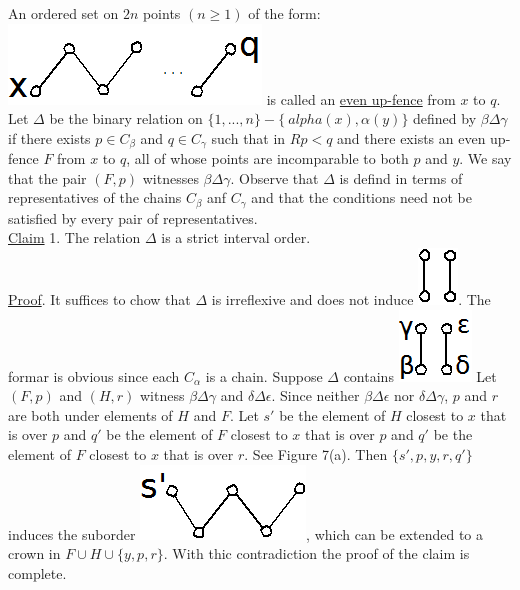 \documentclass[twoside]{article}
\begin{document}
An ordered set on $2n$ points $(n\geq 1)$ of the form: \includegraphics[scale=0.2]{figures/small/small2.png}
is called an \underline {even up-fence}
from $x$ to $q$. Let $\Delta$ be the binary relation on $\{1,...,n\} - \{\ alpha (x), \alpha (y)\}$
defined by $\beta \Delta \gamma$ if there exists $p \in C_{\beta}$ and $q \in C_{\gamma}$
such that in $R p<q$ and there exists an even up-fence $F$ from $x$ to $q$, all of whose points
are incomparable to both $p$ and $y$. We say that the pair $(F,p)$ witnesses $\beta \Delta \gamma$.
Observe that $\Delta$ is defind in terms of representatives of the chains $C_{\beta}$ anf $C_{\gamma}$
and that the conditions need not be satisfied by every pair of representatives.\\
%
%
\newline
\underline{Claim} 1. The relation $\Delta$ is a strict interval order.\\
\newline
\underline{Proof}. It suffices to chow that $\Delta$ is irreflexive and does not induce \includegraphics[scale=0.25]{figures/small/small1.png}.
The formar is obvious since each $C_{\alpha}$ is a chain. Suppose $\Delta$ contains \includegraphics[scale=0.25]{figures/small/small3.png}
Let $(F,p)$ and $(H,r)$ witness $\beta \Delta \gamma$ and $\delta \Delta \epsilon$. Since neither
$\beta \Delta \epsilon$ nor $\delta \Delta \gamma$, $p$ and $r$ are both under elements of $H$
and $F$. Let $s'$ be the element of $H$ closest to $x$ that is over $p$ and $q'$ be the element of $F$
closest to $x$ that is over $p$ and $q'$ be the element of $F$ closest to $x$ that is over $r$. See
Figure 7(a). Then $\{s',p,y,r,q'\}$ induces the suborder \includegraphics[scale=0.25]{figures/small/small4.png}, which can be extended to a crown in
$F \cup H \cup \{y,p,r\}$. With thic contradiction the proof of the claim is complete.\\
\end{document}

